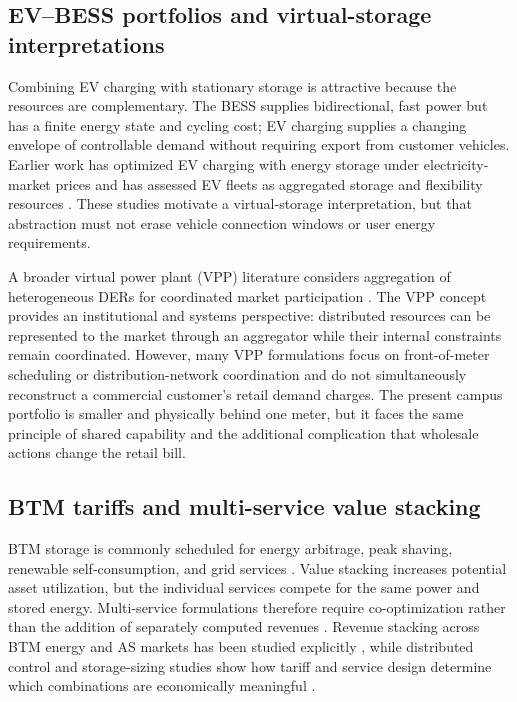\documentclass[final,5p,times]{elsarticle}
\begin{document}
\subsection{EV--BESS portfolios and virtual-storage interpretations}
Combining EV charging with stationary storage is attractive because the resources are complementary. The BESS supplies bidirectional, fast power but has a finite energy state and cycling cost; EV charging supplies a changing envelope of controllable demand without requiring export from customer vehicles. Earlier work has optimized EV charging with energy storage under electricity-market prices \cite{jin2013evstorage} and has assessed EV fleets as aggregated storage and flexibility resources \cite{mills2018evstorage}. These studies motivate a virtual-storage interpretation, but that abstraction must not erase vehicle connection windows or user energy requirements.

A broader virtual power plant (VPP) literature considers aggregation of heterogeneous DERs for coordinated market participation \cite{pudjianto2007vpp} \cite{zamani2016vpp} \cite{qiu2017transactive}. The VPP concept provides an institutional and systems perspective: distributed resources can be represented to the market through an aggregator while their internal constraints remain coordinated. However, many VPP formulations focus on front-of-meter scheduling or distribution-network coordination and do not simultaneously reconstruct a commercial customer's retail demand charges. The present campus portfolio is smaller and physically behind one meter, but it faces the same principle of shared capability and the additional complication that wholesale actions change the retail bill.

\subsection{BTM tariffs and multi-service value stacking}
BTM storage is commonly scheduled for energy arbitrage, peak shaving, renewable self-consumption, and grid services \cite{raoufat2018bess} \cite{wu2017analytical} \cite{chen2021valueStacking}. Value stacking increases potential asset utilization, but the individual services compete for the same power and stored energy. Multi-service formulations therefore require co-optimization rather than the addition of separately computed revenues \cite{hanif2022multiservice}. Revenue stacking across BTM energy and AS markets has been studied explicitly \cite{seward2022revenueStacking}, while distributed control and storage-sizing studies show how tariff and service design determine which combinations are economically meaningful \cite{karandeh2022distributed} \cite{zhang2024btmsizing}.
\end{document}
